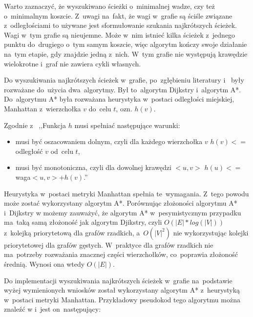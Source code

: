 \documentclass[a4paper,11pt,twoside,openright]{report}
\theoremstyle{definition}
\begin{document}
Warto zaznaczyć, że wyszukiwano ścieżki o~minimalnej wadze, czy też o~minimalnym
koszcie. Z~uwagi na~fakt, że wagi w~grafie są ściśle związane z~odległościami to
używane jest sformułowanie szukania najkrótszych ścieżek. Wagi w~tym grafie są
nieujemne. Może w~nim istnieć kilka ścieżek z~jednego punktu do~drugiego o~tym
samym koszcie, więc algorytm kończy swoje działanie na~tym etapie, gdy znajdzie
jedną z~nich. W~tym grafie nie występują krawędzie wielokrotne i~graf nie zawiera
cykli własnych.

Do wyszukiwania najkrótszych ścieżek w~grafie, po~zgłębieniu literatury
\cite{Algorytmy Sedgewick} i~\cite{AiSD2} były rozważane do~użycia dwa~algorytmy.
Był to~algorytm Dijkstry i~algorytm A*. Do~algorytmu A* była rozważana heurystyka w~postaci
odległości miejskiej, Manhattan z~wierzchołka $v$ do~celu $t$, ozn. $h(v)$.

Zgodnie z~\cite{AiSD2} ,,Funkcja $h$ musi spełniać następujące warunki:

\begin{itemize}[noitemsep]
\item musi być oszacowaniem dolnym, czyli dla każdego wierzchołka $v$ $h(v) <=$ odległość $v$ od~celu $t$,
\item musi być monotoniczna, czyli dla dowolnej krawędzi $<u,v>$ $h(u) <= $waga$<u,v> + h(v)$.''
\end{itemize}

Heurystyka w~postaci metryki Manhattan spełnia te~wymagania. Z~tego powodu może
zostać wykorzystany algorytm A*. Porównując złożoności algorytmu A* i~Dijkstry w
\cite{AiSD2} możemy zauważyć, że algorytm A* w~pesymistycznym przypadku ma~taką
samą złożoność jak algorytm Djikstry, czyli $O(|E|*log(|V|))$ z~kolejką priorytetową
dla grafów rzadkich, a~$O(|V|^2)$ nie wykorzystując kolejki priorytetowej dla
grafów gęstych. W~praktyce dla grafów rzadkich nie ma~potrzeby rozważania znacznej
części wierzchołków, co~poprawia złożoność średnią. Wynosi ona wtedy $O(|E|)$.

Do implementacji wyszukiwania najkrótszych ścieżek w~grafie na~podstawie wyżej
wymienionych wniosków został wykorzystany algorytm A* z~heurystyką w~postaci
metryki Manhattan. Przykładowy pseudokod tego algorytmu można znaleźć w
\cite{AiSD2} i~jest on~następujący: %
\end{document}
